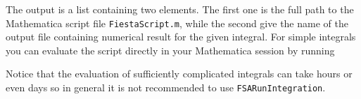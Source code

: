 \documentclass[../FeynHelpersManual.tex]{subfiles}
\begin{document}
\begin{Shaded}
\begin{Highlighting}[]
\ExtensionTok{=}\OperatorTok{[}\OperatorTok{,} \OperatorTok{\{}\OperatorTok{,} \OperatorTok{\}]}
\ExtensionTok{=}\OperatorTok{[}\OperatorTok{[}\OperatorTok{,} \OperatorTok{\{}\OperatorTok{[\{}\OperatorTok{,}\OperatorTok{\}],}\OperatorTok{[\{}\SpecialCharTok{+} \OperatorTok{,}\OperatorTok{\}]\},} \OperatorTok{\{}\OperatorTok{\},} \OperatorTok{\{}\OperatorTok{\},} \OperatorTok{\{\},} \OperatorTok{\{\}],} \SpecialCharTok{{-}}\OperatorTok{]}
\ExtensionTok{=}\OperatorTok{[}\OperatorTok{,}\OperatorTok{,} \OperatorTok{[],}\OtherTok{{-}\textgreater{}} \OperatorTok{\{}\OperatorTok{[}\OperatorTok{][}\OperatorTok{]} \OtherTok{{-}\textgreater{}}\OperatorTok{\},}\OtherTok{{-}\textgreater{}} \OperatorTok{\{}\OtherTok{{-}\textgreater{}} \OperatorTok{,}\OtherTok{{-}\textgreater{}} \OperatorTok{,}\OtherTok{{-}\textgreater{}} \OperatorTok{\},}\OtherTok{{-}\textgreater{}} \OperatorTok{]}
\end{Highlighting}
\end{Shaded}

The output is a list containing two elements. The first one is the full
path to the Mathematica script file \texttt{FiestaScript.m}, while the
second give the name of the output file containing numerical result for
the given integral. For simple integrals you can evaluate the script
directly in your Mathematica session by running

\begin{Shaded}
\begin{Highlighting}[]
\OperatorTok{[}\OperatorTok{[[}\OperatorTok{]]]}
\end{Highlighting}
\end{Shaded}

Notice that the evaluation of sufficiently complicated integrals can
take hours or even days so in general it is not recommended to use
\texttt{FSARunIntegration}.
\end{document}
